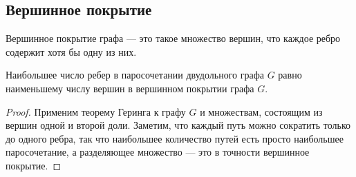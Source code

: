 \subsection{Вершинное покрытие}

\begin{defn}
    Вершинное покрытие графа --- это такое множество вершин, что каждое ребро содержит хотя бы одну из них.
\end{defn}

\begin{theorem}[Кениг, 1931]
    Наибольшее число ребер в паросочетании двудольного графа $G$ равно наименьшему числу вершин в вершинном покрытии графа $G$.
\end{theorem}

\begin{proof}
    Применим теорему Геринга к графу $G$ и множествам, состоящим из вершин одной и второй доли. Заметим, что каждый путь можно сократить только до одного ребра, так что наибольшее количество путей есть просто наибольшее паросочетание, а разделяющее множество --- это в точности вершинное покрытие.
\end{proof}
